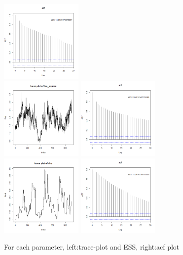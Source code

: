 \documentclass{article}
\begin{document}
\begin{figure}[!h]
    \includegraphics[width=4cm]{prob2_sigma_square_acf.png}\\
    \includegraphics[width=4cm]{prob2_tau_square_traceplot.png}
    \includegraphics[width=4cm]{prob2_tau_square_acf.png}
    \includegraphics[width=4cm]{prob2_rho_traceplot.png}
    \includegraphics[width=4cm]{prob2_rho_acf.png}
    \caption{For each parameter, left:trace-plot and ESS, right:acf plot}
\end{figure}
\end{document}
